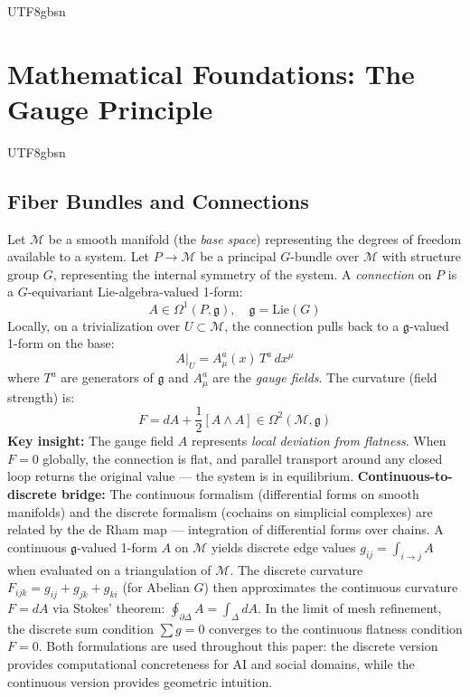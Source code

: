 \documentclass[11pt,a4paper]{article}
\newcommand{\Manifold}{\mathcal{M}}
\begin{document}
\begin{CJK}{UTF8}{gbsn}
{\section{Mathematical Foundations: The Gauge Principle}
\label{sec:math}
\begin{CJK}{UTF8}{gbsn}
\subsection{Fiber Bundles and Connections}
Let $\Manifold$ be a smooth manifold (the \textit{base space}) representing the degrees
of freedom available to a system. Let $P \to \Manifold$ be a principal $G$-bundle over
$\Manifold$ with structure group $G$, representing the internal symmetry of the system.
A \textit{connection} on $P$ is a $G$-equivariant Lie-algebra-valued 1-form:
\begin{equation}
    A \in \Omega^1(P, \mathfrak{g}), \quad \mathfrak{g} = \mathrm{Lie}(G)
\end{equation}
Locally, on a trivialization over $U \subset \Manifold$, the connection pulls back to a
$\mathfrak{g}$-valued 1-form on the base:
\begin{equation}
    A|_U = A_\mu^a(x) \, T^a \, dx^\mu
\end{equation}
where $T^a$ are generators of $\mathfrak{g}$ and $A_\mu^a$ are the \textit{gauge fields}.
The curvature (field strength) is:
\begin{equation}
    F = dA + \frac{1}{2}[A \wedge A] \in \Omega^2(\Manifold, \mathfrak{g})
\end{equation}
\textbf{Key insight:} The gauge field $A$ represents \textit{local deviation from flatness}.
When $F = 0$ globally, the connection is flat, and parallel transport around any closed
loop returns the original value --- the system is in equilibrium.
\medskip
\noindent
\textbf{Continuous-to-discrete bridge:} The continuous formalism (differential forms on
smooth manifolds) and the discrete formalism (cochains on simplicial complexes) are
related by the de Rham map --- integration of differential forms over chains. A continuous
$\mathfrak{g}$-valued 1-form $A$ on $\Manifold$ yields discrete edge values
$g_{ij} = \int_{i \to j} A$ when evaluated on a triangulation of $\Manifold$. The
discrete curvature $F_{ijk} = g_{ij} + g_{jk} + g_{ki}$ (for Abelian $G$) then approximates
the continuous curvature $F = dA$ via Stokes' theorem: $\oint_{\partial\Delta} A = \int_\Delta dA$.
In the limit of mesh refinement, the discrete sum condition $\sum g = 0$ converges to the
continuous flatness condition $F = 0$. Both formulations are used throughout this paper:
the discrete version provides computational concreteness for AI and social domains, while
the continuous version provides geometric intuition.

\end{CJK}}
\end{CJK}
\end{document}
